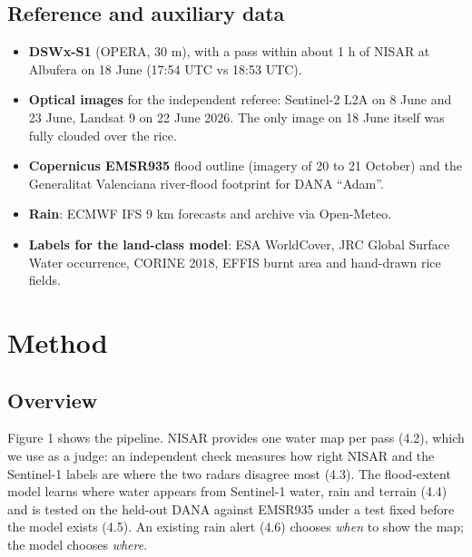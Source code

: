 \documentclass[10pt,twocolumn]{article}
\begin{document}
\subsection{Reference and auxiliary data}
\begin{itemize}
\item{} \textbf{DSWx-S1} (OPERA, 30 m), with a pass within about 1 h of NISAR at Albufera on 18 June (17:54 UTC vs 18:53 UTC).
\item{} \textbf{Optical images} for the independent referee: Sentinel-2 L2A on 8 June and 23 June, Landsat 9 on 22 June 2026. The only image on 18 June itself was fully clouded over the rice.
\item{} \textbf{Copernicus EMSR935} flood outline (imagery of 20 to 21 October) and the Generalitat Valenciana river-flood footprint for DANA ``Adam''.
\item{} \textbf{Rain}: ECMWF IFS 9 km forecasts and archive via Open-Meteo.
\item{} \textbf{Labels for the land-class model}: ESA WorldCover, JRC Global Surface Water occurrence, CORINE 2018, EFFIS burnt area and hand-drawn rice fields.
\end{itemize}
\section{Method}
\subsection{Overview}
Figure 1 shows the pipeline. NISAR provides one water map per pass (4.2), which we use as a judge: an independent check measures how right NISAR and the Sentinel-1 labels are where the two radars disagree most (4.3). The flood-extent model learns where water appears from Sentinel-1 water, rain and terrain (4.4) and is tested on the held-out DANA against EMSR935 under a test fixed before the model exists (4.5). An existing rain alert (4.6) chooses \emph{when} to show the map; the model chooses \emph{where}.
\end{document}
